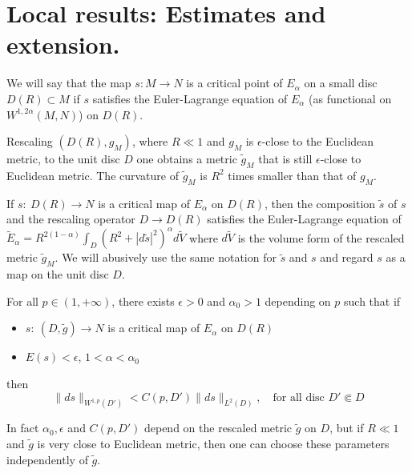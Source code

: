 \section{Local results: Estimates and extension.}
\label{sec:org5c54772}

We will say that the map \(s: M \longrightarrow N\) is a critical point of \(E_\alpha\) on a small disc \(D(R)\subset M\) if \(s\) satisfies the Euler-Lagrange equation of
\(E_\alpha\) (as functional on \(W^{1,2\alpha}(M,N)\)) on \(D(R)\).

\begin{remark}
\label{rem:rescal-Euclide}
Rescaling \((D(R), g_M)\), where \(R\ll 1\) and \(g_M\) is
\(\epsilon\)-close to the Euclidean metric, to the unit disc \(D\) one obtains a
metric \(\tilde g_M\) that is still \(\epsilon\)-close to Euclidean metric. The
curvature of \(\tilde g_M\) is \(R^2\) times smaller than that of \(g_M\).
\end{remark}

If \(s:\ D(R) \longrightarrow N\) is a critical map
of \(E_\alpha\) on \(D(R)\), then the composition \(\tilde s\) of \(s\) and the rescaling operator \(D
\longrightarrow D(R)\) satisfies the Euler-Lagrange equation of \(\tilde E_\alpha =
R^{2(1-\alpha)}\int_D (R^2 + |d\tilde s|^2)^\alpha d\tilde V\) where \(d\tilde V\) is
the volume form of the rescaled metric \(\tilde g_M\). We will abusively
use the same notation for \(\tilde s\) and \(s\) and regard \(s\) as a map on the unit disc \(D\). 

\begin{lemma}
\label{lem:main-est}
For all \(p\in (1,+\infty)\), there exists \(\epsilon>0\) and \(\alpha_0 >1\)
depending on \(p\) such that if
\begin{itemize}
\item \(s:\ (D,\tilde g) \longrightarrow N\) is a critical map of \(E_\alpha\) on \(D(R)\)
\item \(E(s) < \epsilon\), \(1 < \alpha <\alpha_0\)
\end{itemize}
then
\[
 \|ds\|_{W^{1,p}(D')} < C(p,D') \|ds\|_{L^2(D)},\quad \text{for all disc }  D'\Subset D 
\]
\end{lemma}

\begin{remark}
In fact \(\alpha_0, \epsilon\) and \(C(p,D')\) depend on the rescaled metric \(\tilde
g\) on \(D\), but if \(R \ll 1\) and \(\tilde g\) is very close to Euclidean metric,
then one can choose these parameters independently of \(\tilde g\). 
\end{remark}

